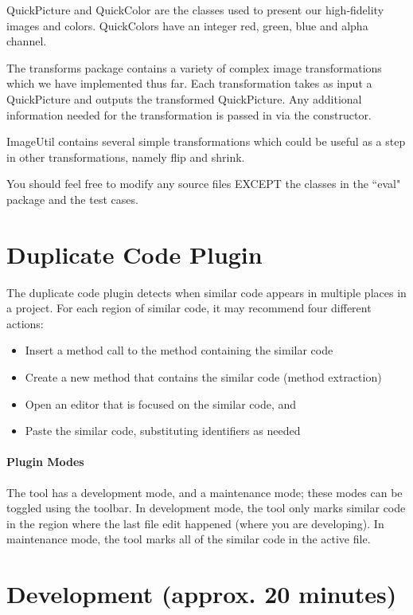 \documentclass[12pt]{article}
\begin{document}
QuickPicture and QuickColor are the classes used to present our high-fidelity images and colors.
QuickColors have an integer red, green, blue and alpha channel.

The transforms package contains a variety of complex image transformations which we 
have implemented thus far.  Each transformation takes as input a QuickPicture and outputs 
the transformed QuickPicture.  Any additional information needed for the transformation 
is  passed in via the constructor.

ImageUtil contains several simple transformations which could be useful as a step in other 
transformations, namely flip and shrink.

You should feel free to modify any source files EXCEPT the classes in the ``eval" package
and the test cases.

\section{Duplicate Code Plugin}
The duplicate code plugin detects when similar code appears in
multiple places in a project. For each region of similar code, it may
recommend four different actions:

\begin{itemize}
  \item Insert a method call to the method containing the similar code
  \item Create a new method that contains the similar code (method extraction)
  \item Open an editor that is focused on the similar code, and
  \item Paste the similar code, substituting identifiers as needed
\end{itemize}

\paragraph{Plugin Modes}
The tool has a development mode, and a maintenance mode; these modes
can be toggled using the toolbar. In development mode, the tool only
marks similar code in the region where the last file edit happened
(where you are developing). In maintenance mode, the tool marks all of
the similar code in the active file.

\section{Development (approx. 20 minutes)}
\end{document}
